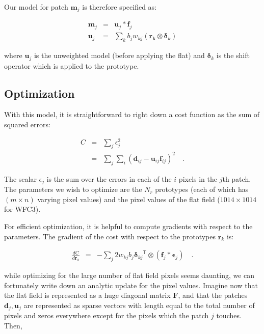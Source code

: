 \documentclass[12pt,preprint,pdftex]{aastex}
\newcommand{\vc}[1]{\mathbf{#1}}
\newcommand{\transpose}[1]{{#1}^{\!{\mathsf{T}}}}
\begin{document}
Our model for patch $\vc{m}_j$ is therefore specified as:

\begin{eqnarray}
\vc{m}_j &=& \vc{u}_j * \vc{f}_j \\
\vc{u}_j &=& \sum_k b_j w_{kj} (\vc{r_k} \otimes \vc{\delta}_k)
\label{eq:model}
\end{eqnarray}

\noindent where $\vc{u}_j$ is the unweighted model (before applying the flat) and 
$\vc{\delta}_k$ is the shift operator which is applied to the prototype.

\subsection{Optimization}

With this model, it is straightforward to right down a cost function as the sum of squared 
errors:

\begin{eqnarray}
C &=& \sum_j \epsilon_j^2 \\
    &=& \sum_j \sum_i (\vc{d}_{ij} - \vc{u}_{ij} \vc{f}_{ij})^2
\quad .
\label{eq:cost}
\end{eqnarray}

\noindent The scalar $\epsilon_j$ is the sum over the errors in each of the $i$ pixels in the 
$j$th patch.  The 
parameters we wish to optimize are the $N_r$ prototypes (each of which has $(m \times n)$ 
varying pixel values) and the pixel values of the flat field ($1014 \times 1014$ for WFC3).

For efficient optimization, it is helpful to compute gradients with respect to the parameters.  
The gradient of the cost with respect to the prototypes $\vc{r}_k$ is:

\begin{eqnarray}
\frac{dC}{d\vc{r}_k} &=& - \sum_j 2 w_{kj} b_j \transpose{\vc{\delta}_{kj}} \otimes (\vc{f}_j * \vc{\epsilon}_j)
\quad .
\label{eq:pk_grad}
\end{eqnarray}

\noindent while optimizing for the large number of flat field pixels seems daunting, we can 
fortunately write down an analytic update for the pixel values.  Imagine now that the flat field 
is represented as a huge diagonal matrix $\vc{F}$, and that the patches $\vc{d}_j, \vc{u}_j$ 
are represented as sparse vectors with length equal to the total number of pixels and zeros 
everywhere except for the pixels which the patch $j$ touches.  Then, 
\end{document}
